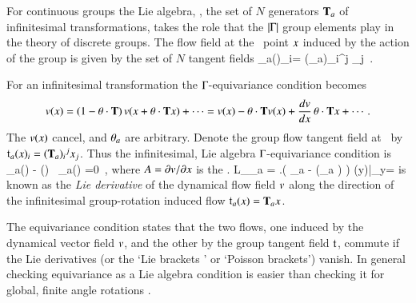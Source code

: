 For continuous groups the {Lie algebra}, \ie,
the set of $N$ generators $\mathbf{T}_a$ of infinitesimal
transformations, takes the role that the $|\Gamma|$ group
elements play in the theory of discrete groups. The flow field
at the \statesp\ point $x$ induced by the action of the group
is given by the set of $N$ tangent fields
\beq
\groupTan_a(\ssp)_{i}= (\Lg_a){}_{i}{}^j \ssp_j
\,.



%
For an infinitesimal transformation 
the $\Group$-equivariance condition 
becomes
\[
\vel(\ssp) =(1-\gSpace \cdot \Lg) \, \vel(\ssp+\gSpace \cdot \Lg \ssp) + \cdots
       =\vel(\ssp)- \gSpace \cdot \Lg \vel(\ssp)
             + \frac{d\vel}{d\ssp} \,\gSpace \cdot \Lg \ssp + \cdots
\,.
\]
The $v(x)$ cancel, and ${\bf \theta}_a$ are arbitrary. Denote
the group flow tangent field at \ssp\ by
$\mathfrak{t}_a(x)_{i}= (\mathbf{T}_a){}_{i}{}^j x_j$. Thus the
infinitesimal, Lie algebra $\Gamma$-equivariance condition is
\beq
  \groupTan_a(\vel)  - \Mvar(\ssp) \, \groupTan_a(\ssp) =0
  \,,
where $A = {\partial v}/{\partial x}$ is the \stabmat.
\beq
{\cal L}_{\groupTan_a} \vel =
\left.\left(
  \Lg_a - (\Lg_a \ssp)
 \right) \vel(y)\right|_{y=\ssp}
is known as the {\em Lie derivative} of the dynamical flow
field $v$ along the direction of the infinitesimal
group-rotation induced flow $\mathfrak{t}_a(x)= \mathbf{T}_a x$.

The equivariance condition  states that the two
flows, one induced by the dynamical vector field $v$, and
the other by the group tangent field $\mathfrak{t}$, commute if
the Lie derivatives (or the `Lie brackets ' or `Poisson
brackets') vanish.
In general checking equivariance as a Lie algebra condition
 is easier than checking it for global,
finite angle rotations .
